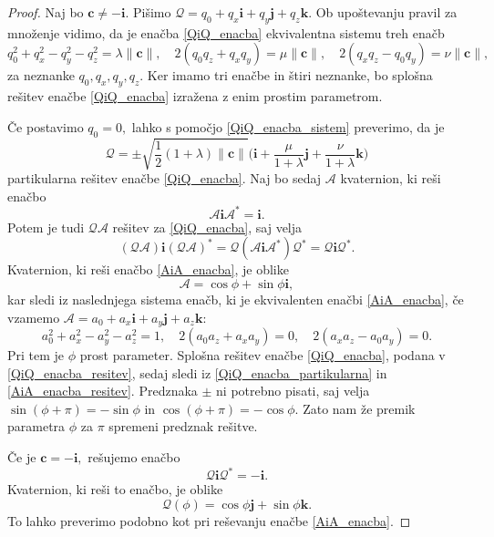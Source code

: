 \documentclass[12pt,a4paper,twoside]{article}
\theoremstyle{definition} %
\theoremstyle{plain} %
\theoremstyle{primerstyle}
\numberwithin{equation}{section}  %
\newcommand{\cV}{\mathbf{c}}
\newcommand{\iV}{\mathbf{i}}
\newcommand{\jV}{\mathbf{j}}
\newcommand{\kV}{\mathbf{k}}
\newcommand{\AQ}{\mathcal{A}}
\newcommand{\QQ}{\mathcal{Q}}
\begin{document}
\begin{proof}
	Naj bo $\cV\neq-\iV.$ Pišimo $\QQ=q_0+q_x\iV+q_y\jV+q_z\kV.$ Ob upoštevanju pravil za množenje vidimo, da je enačba \eqref{QiQ_enacba} ekvivalentna sistemu treh enačb
	\begin{equation}
		\label{QiQ_enacba_sistem}
		q_0^2+q_x^2-q_y^2-q_z^2=\lambda\lVert\cV\rVert,\quad 2(q_0q_z+q_xq_y)=\mu\lVert\cV\rVert,\quad 2(q_xq_z-q_0q_y)=\nu\lVert\cV\rVert,
	\end{equation}
	za neznanke $q_0,q_x,q_y,q_z.$ Ker imamo tri enačbe in štiri neznanke, bo splošna rešitev enačbe \eqref{QiQ_enacba} izražena z enim prostim parametrom.
	
	Če postavimo $q_0=0,$ lahko s pomočjo \eqref{QiQ_enacba_sistem} preverimo, da je
	\begin{equation}
		\label{QiQ_enacba_partikularna}
		\QQ=\pm\sqrt{\frac{1}{2}(1+\lambda)\lVert\cV\rVert}\Big(\iV+\frac{\mu}{1+\lambda}\jV+\frac{\nu}{1+\lambda}\kV\Big)
	\end{equation}
	partikularna rešitev enačbe \eqref{QiQ_enacba}. Naj bo sedaj $\AQ$ kvaternion, ki reši enačbo
	\begin{equation}
		\label{AiA_enacba}
		\AQ\iV\AQ^*=\iV.
	\end{equation}
	Potem je tudi $\QQ\AQ$ rešitev za \eqref{QiQ_enacba}, saj velja
	$$(\QQ\AQ)\iV(\QQ\AQ)^*=\QQ(\AQ\iV\AQ^*)\QQ^*=\QQ\iV\QQ^*.$$
	Kvaternion, ki reši enačbo \eqref{AiA_enacba}, je oblike
	\begin{equation}
		\label{AiA_enacba_resitev}
		\AQ=\cos\phi+\sin\phi\iV,
	\end{equation}
	kar sledi iz naslednjega sistema enačb, ki je ekvivalenten enačbi \eqref{AiA_enacba}, če vzamemo $\AQ=a_0+a_x\iV+a_y\jV+a_z\kV$:
	$$a_0^2+a_x^2-a_y^2-a_z^2=1,\quad 2(a_0a_z+a_xa_y)=0,\quad 2(a_xa_z-a_0a_y)=0.$$
	Pri tem je $\phi$ prost parameter. Splošna rešitev enačbe \eqref{QiQ_enacba}, podana v \eqref{QiQ_enacba_resitev}, sedaj sledi iz \eqref{QiQ_enacba_partikularna} in \eqref{AiA_enacba_resitev}. Predznaka $\pm$ ni potrebno pisati, saj velja $\sin(\phi+\pi)=-\sin\phi$ in $\cos(\phi+\pi)=-\cos\phi.$ Zato nam že premik parametra $\phi$ za $\pi$ spremeni predznak rešitve.
	
	Če je $\cV=-\iV,$ rešujemo enačbo
	\begin{equation}
		\label{QiQ-i_enacba}
		\QQ\iV\QQ^*=-\iV.
	\end{equation}
	Kvaternion, ki reši to enačbo, je oblike
	\begin{equation}
		\label{QiQ-i_enacba_resitev}
		\QQ(\phi)=\cos\phi\jV+\sin\phi\kV.
	\end{equation}
	To lahko preverimo podobno kot pri reševanju enačbe \eqref{AiA_enacba}.
\end{proof}
\clearpage
\end{document}
